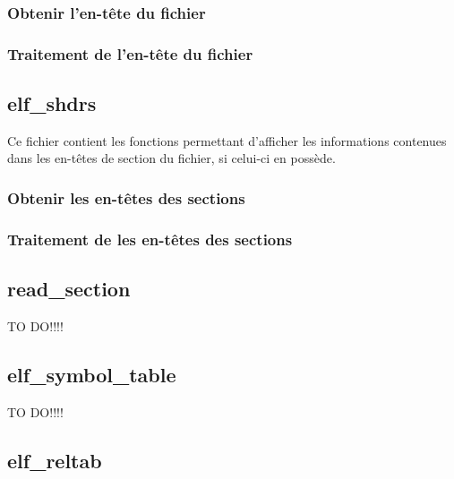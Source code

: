 \documentclass[a4paper]{article} %
\begin{document}
\subsubsection*{Obtenir l'en-tête du fichier}

\subsubsection*{Traitement de l'en-tête du fichier}


\subsection{elf\_shdrs}
\label{sec:sectionheader}
\noindent Ce fichier contient les fonctions permettant d'afficher les informations contenues dans les en-têtes de section du fichier, si celui-ci en possède.

\subsubsection*{Obtenir les en-têtes des sections}

\subsubsection*{Traitement de les en-têtes des sections}


\subsection{read\_section}
\label{sec:section}

TO DO!!!!


\subsection{elf\_symbol\_table}
\label{sec:symbol}

TO DO!!!!


\subsection{elf\_reltab}
\label{sec:relocation}
\end{document}
